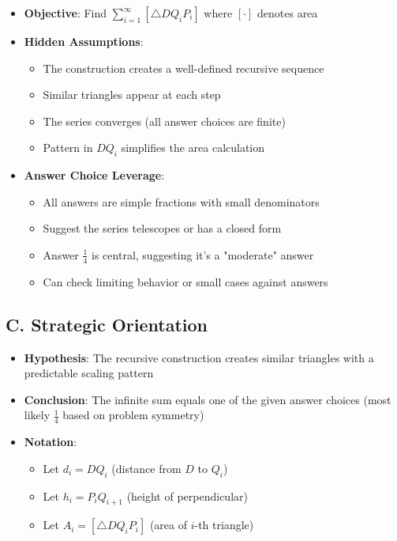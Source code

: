 \documentclass[]{article}
\begin{document}
\begin{problemconfigbox}
\begin{itemize}[leftmargin=*]
    \item \textbf{Objective}: Find $\sum_{i=1}^{\infty} [\triangle DQ_i P_i]$ where $[\cdot]$ denotes area
    
    \item \textbf{Hidden Assumptions}:
    \begin{itemize}
        \item The construction creates a well-defined recursive sequence
        \item Similar triangles appear at each step
        \item The series converges (all answer choices are finite)
        \item Pattern in $DQ_i$ simplifies the area calculation
    \end{itemize}
    
    \item \textbf{Answer Choice Leverage}:
    \begin{itemize}
        \item All answers are simple fractions with small denominators
        \item Suggest the series telescopes or has a closed form
        \item Answer $\frac{1}{4}$ is central, suggesting it's a "moderate" answer
        \item Can check limiting behavior or small cases against answers
    \end{itemize}
\end{itemize}

\subsection*{C. Strategic Orientation}
\begin{itemize}[leftmargin=*]
    \item \textbf{Hypothesis}: The recursive construction creates similar triangles with a predictable scaling pattern
    
    \item \textbf{Conclusion}: The infinite sum equals one of the given answer choices (most likely $\frac{1}{4}$ based on problem symmetry)
    
    \item \textbf{Notation}:
    \begin{itemize}
        \item Let $d_i = DQ_i$ (distance from $D$ to $Q_i$)
        \item Let $h_i = P_iQ_{i+1}$ (height of perpendicular)
        \item Let $A_i = [\triangle DQ_iP_i]$ (area of $i$-th triangle)
    \end{itemize}
    

\end{itemize}
\end{problemconfigbox}
\end{document}
